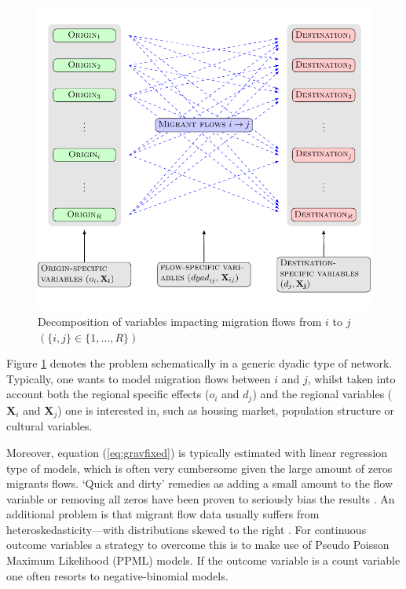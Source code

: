 \documentclass[11pt,parskip,abstracton,notitlepage, dvipsnames]{scrartcl}
\begin{document}
\begin{figure}[ht]\centering
  \includegraphics[width=\linewidth]{./../../fig/gravity_network.pdf}
  \caption{Decomposition of variables impacting migration flows from $i$ to $j$
    $\left(\{i,j\} \in \{1,\ldots, R\}\right)$}
  \label{fig:gravity_network}
\end{figure}
Figure \ref{fig:gravity_network} denotes the problem schematically in a generic
dyadic type of network. Typically, one wants to model migration flows between
$i$ and $j$, whilst taken into account both the regional specific effects
($o_i$ and $d_j$) and the regional variables ($\mathbf{X}_i$ and
$\mathbf{X}_j$) one is interested in, such as housing market, population
structure or cultural variables.

Moreover, equation (\ref{eq:gravfixed}) is typically estimated with linear
regression type of models, which is often very cumbersome given the large amount
of zeros migrants flows. `Quick and dirty' remedies as adding a small amount to
the flow variable or removing all zeros have been proven to seriously bias the
results \citep{linders2006estimation, burger2009specification}. An additional problem is that migrant flow data usually suffers from heteroskedasticity---with distributions skewed to the right \citep[][actually states that heteroskedasticity (rather than the presence of too many zeros) is responsible
for the main source of bias within gravity models.]{silva2006log}. For continuous outcome variables a strategy to overcome this is to make use of Pseudo Poisson Maximum Likelihood (PPML) models. If the outcome variable is a count variable one often resorts to negative-binomial models.    
\end{document}
